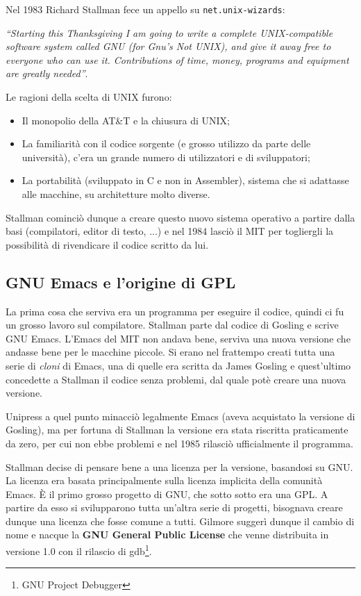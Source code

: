 Nel 1983 Richard Stallman fece un appello su \texttt{net.unix-wizards}:

\begin{center}
	\textit{``Starting this Thanksgiving I am going to write a complete UNIX-compatible software system called GNU (for Gnu’s Not UNIX), and give it away free to everyone who can use it. Contributions of time, money, programs and equipment are greatly needed''}.
\end{center}

Le ragioni della scelta di UNIX furono:

\begin{itemize}
	\item Il monopolio della AT\&T e la chiusura di UNIX;
	\item La familiarità con il codice sorgente (e grosso utilizzo da parte delle università), c'era un grande numero di utilizzatori e di sviluppatori;
	\item La portabilità (sviluppato in C e non in Assembler), sistema che si adattasse alle macchine, su architetture molto diverse.
	
\end{itemize}

Stallman cominciò dunque a creare questo nuovo sistema operativo a partire dalla basi (compilatori, editor di testo, ...) e nel 1984 lasciò il MIT per togliergli la possibilità di rivendicare il codice scritto da lui. 

\subsection{GNU Emacs e l'origine di GPL}

La prima cosa che serviva era un programma per eseguire il codice, quindi ci fu un grosso lavoro sul compilatore. Stallman parte dal codice di Gosling e scrive GNU Emacs. L'Emacs del MIT non andava bene, serviva una nuova versione che andasse bene per le macchine piccole. Si erano nel frattempo creati tutta una serie di \textit{cloni} di Emacs, una di quelle era scritta da James Gosling e quest'ultimo concedette a Stallman il codice senza problemi, dal quale potè creare una nuova versione.

Unipress a quel punto minacciò legalmente Emacs (aveva acquistato la versione di Gosling), ma per fortuna di Stallman la versione era stata riscritta praticamente da zero, per cui non ebbe problemi e nel 1985 rilasciò ufficialmente il programma. 

Stallman decise di pensare bene a una licenza per la versione, basandosi su GNU. La licenza era basata principalmente sulla licenza implicita della comunità Emacs. È il primo grosso progetto di GNU, che sotto sotto era una GPL. A partire da esso si svilupparono tutta un'altra serie di progetti, bisognava creare dunque una licenza che fosse comune a tutti. Gilmore suggerì dunque il cambio di nome e nacque la \textbf{GNU General Public License} che venne distribuita in versione 1.0 con il rilascio di gdb\footnote{GNU Project Debugger}.

